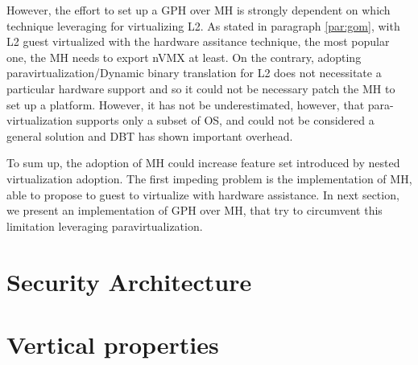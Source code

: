 \documentclass{sig-alternate}
\begin{document}
However, the effort to set up a GPH over MH is strongly dependent on which technique leveraging for virtualizing L2. As stated in paragraph \ref{par:gom}, with L2 guest virtualized with the hardware assitance technique, the most popular one, the MH needs to export nVMX at least. 
On the contrary, adopting paravirtualization/Dynamic binary translation for L2 does not necessitate a particular hardware support and so it could not be necessary patch the MH to set up a platform. 
However, it has not be underestimated, however, that para-virtualization supports only a subset of OS, and could not be considered a general solution and DBT has shown important overhead.

To sum up,  the adoption of MH could  increase feature set introduced by nested virtualization adoption. The first impeding problem is the implementation of MH, able to propose to guest to virtualize with hardware assistance. In next section, we present an implementation of GPH over MH, that try to circumvent this limitation leveraging paravirtualization.
\section{Security Architecture}
\label{ref:arch}
\section{Vertical properties}
\end{document}
